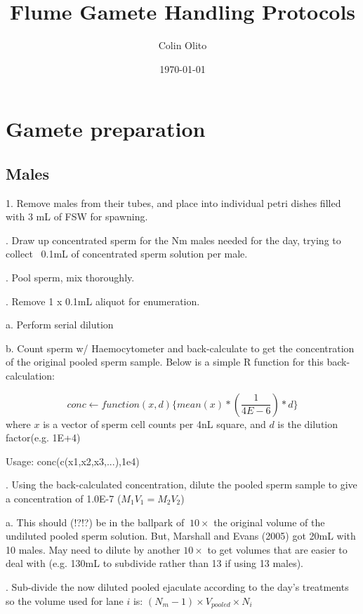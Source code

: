 \documentclass[12pt]{article}
\title{Flume Gamete Handling Protocols}
\author{Colin Olito}
\date{\today}
\begin{document}
\maketitle

\newpage{}

\section{Gamete preparation}
\subsection{Males}

1. Remove males from their tubes, and place into individual petri dishes filled with 3 mL of FSW for spawning. \bigskip

. Draw up concentrated sperm for the Nm males needed for the day, trying to collect ~0.1mL of concentrated sperm solution per male. \bigskip

. Pool sperm, mix thoroughly. \bigskip

. Remove 1 x 0.1mL aliquot for enumeration. \bigskip

a. Perform serial dilution

b. Count sperm w/ Haemocytometer and back-calculate to get the concentration of the original pooled sperm sample. Below is a simple R function for this back-calculation: \bigskip

\[
conc \leftarrow function(x,d)\{mean(x) * (\frac{1}{4E-6})*d\}
\]
where $x$ is a vector of sperm cell counts per 4nL square, and $d$ is the dilution factor(e.g. 1E+4) \bigskip

Usage:  conc(c(x1,x2,x3,...),1e4) \bigskip

. Using the back-calculated concentration, dilute the pooled sperm sample to give a concentration of 1.0E-7 ($M_1 V_1 = M_2 V_2$)

a. This should (!?!?) be in the ballpark of $~10\times$ the original volume of the undiluted pooled sperm solution. But, Marshall and Evans (2005) got 20mL with 10 males. May need to dilute by another $10\times$ to get volumes that are easier to deal with (e.g. 130mL to subdivide rather than 13 if using 13 males). \bigskip

. Sub-divide the now diluted pooled ejaculate according to the day's treatments so the volume used for lane $i$ is: $(N_m-1) \times V_{pooled} \times N_i$
\end{document}
